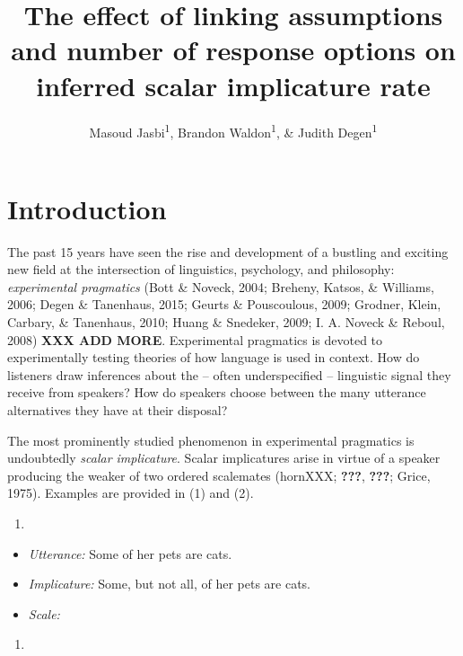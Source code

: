 \documentclass[floatsintext,man]{apa6}
\title{The effect of linking assumptions and number of response options on
inferred scalar implicature rate}
\author{Masoud Jasbi\textsuperscript{1}, Brandon Waldon\textsuperscript{1}, \& Judith Degen\textsuperscript{1}}
\affiliation{
    \vspace{0.5cm}
          \textsuperscript{1} Stanford University  }
\providecommand{\tightlist}{%
  \setlength{\itemsep}{0pt}\setlength{\parskip}{0pt}}
\theoremstyle{definition}
\theoremstyle{definition}
\theoremstyle{definition}
\theoremstyle{remark}
\begin{document}
\maketitle

\setcounter{secnumdepth}{0}



\section{Introduction}\label{introduction}

The past 15 years have seen the rise and development of a bustling and
exciting new field at the intersection of linguistics, psychology, and
philosophy: \emph{experimental pragmatics} (Bott \& Noveck, 2004;
Breheny, Katsos, \& Williams, 2006; Degen \& Tanenhaus, 2015; Geurts \&
Pouscoulous, 2009; Grodner, Klein, Carbary, \& Tanenhaus, 2010; Huang \&
Snedeker, 2009; I. A. Noveck \& Reboul, 2008) \textbf{XXX ADD MORE}.
Experimental pragmatics is devoted to experimentally testing theories of
how language is used in context. How do listeners draw inferences about
the -- often underspecified -- linguistic signal they receive from
speakers? How do speakers choose between the many utterance alternatives
they have at their disposal?

The most prominently studied phenomenon in experimental pragmatics is
undoubtedly \emph{scalar implicature}. Scalar implicatures arise in
virtue of a speaker producing the weaker of two ordered scalemates
(hornXXX; {\textbf{???}}, {\textbf{???}}; Grice, 1975). Examples are
provided in (1) and (2).

\begin{enumerate}
\def\labelenumi{\arabic{enumi}.}
\item
\end{enumerate}

\begin{itemize}
\tightlist
\item
  \emph{Utterance:} Some of her pets are cats.
\item
  \emph{Implicature:} Some, but not all, of her pets are cats.
\item
  \emph{Scale:} 
\end{itemize}

\begin{enumerate}
\def\labelenumi{\arabic{enumi}.}
\setcounter{enumi}{1}
\item
\end{enumerate}
\end{document}
